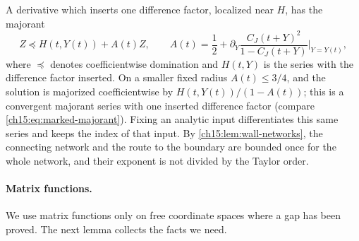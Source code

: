 A derivative which inserts one difference factor, localized near $H$, has the majorant
\begin{equation}\label{ch16:eq:marked-majorant}
 Z\preceq H(t,Y(t))+A(t)Z,\qquad
 A(t)=\frac12+
 \partial_Y\frac{C_J(t+Y)^2}{1-C_J(t+Y)}\bigg|_{Y=Y(t)},
\end{equation}
where $\preceq$ denotes coefficientwise domination and $H(t,Y)$ is the series with the difference factor inserted. On a smaller fixed radius $A(t)\le3/4$, and the solution is majorized coefficientwise by $H(t,Y(t))/(1-A(t))$; this is a convergent majorant series with one inserted difference factor (compare \eqref{ch15:eq:marked-majorant}). Fixing an analytic input differentiates this same series and keeps the index of that input. By \cref{ch15:lem:wall-networks}, the connecting network and the route to the boundary are bounded once for the whole network, and their exponent is not divided by the Taylor order.

\paragraph{Matrix functions.}
We use matrix functions only on free coordinate spaces where a gap has been proved. The next lemma collects the facts we need.

